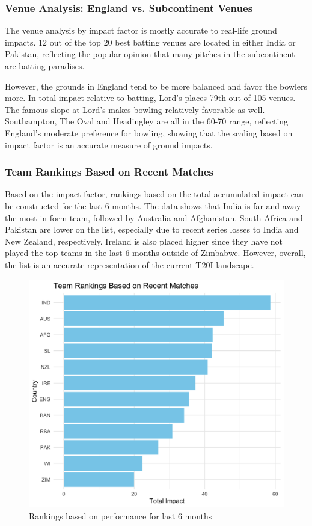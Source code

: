 \documentclass{article}[12pt]
\begin{document}
\subsubsection{Venue Analysis: England vs. Subcontinent Venues}

The venue analysis by impact factor is mostly accurate to real-life ground impacts. 12 out of the top 20 best batting venues are located in either India or Pakistan, reflecting the popular opinion that many pitches in the subcontinent are batting paradises.

However, the grounds in England tend to be more balanced and favor the bowlers more. In total impact relative to batting, Lord's places 79th out of 105 venues. The famous slope at Lord's makes bowling relatively favorable as well. Southampton, The Oval and Headingley are all in the 60-70 range, reflecting England's moderate preference for bowling, showing that the scaling based on impact factor is an accurate measure of ground impacts.

\subsubsection{Team Rankings Based on Recent Matches}

Based on the impact factor, rankings based on the total accumulated impact can be constructed for the last 6 months. The data shows that India is far and away the most in-form team, followed by Australia and Afghanistan. South Africa and Pakistan are lower on the list, especially due to recent series losses to India and New Zealand, respectively. Ireland is also placed higher since they have not played the top teams in the last 6 months outside of Zimbabwe. However, overall, the list is an accurate representation of the current T20I landscape. 

\begin{figure}[!ht]
    \centering
    \includegraphics[width=0.5\linewidth]{team_rankings.png}
    \caption{Rankings based on performance for last 6 months}
    \label{fig:rankings}
\end{figure}
\end{document}
